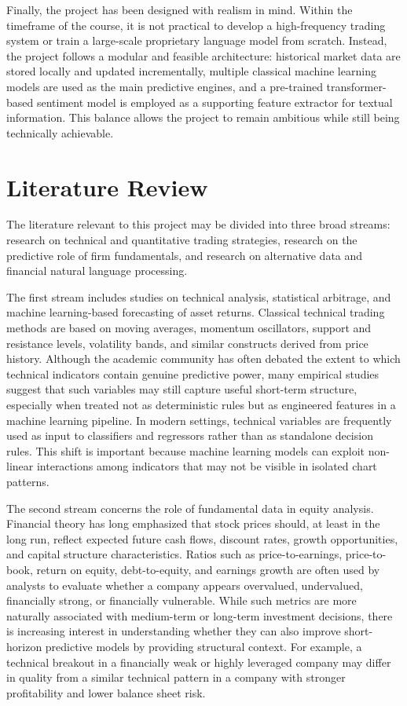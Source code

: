 \documentclass[12pt,a4paper]{article}
\begin{document}
Finally, the project has been designed with realism in mind. Within the timeframe of the course, it is not practical to develop a high-frequency trading system or train a large-scale proprietary language model from scratch. Instead, the project follows a modular and feasible architecture: historical market data are stored locally and updated incrementally, multiple classical machine learning models are used as the main predictive engines, and a pre-trained transformer-based sentiment model is employed as a supporting feature extractor for textual information. This balance allows the project to remain ambitious while still being technically achievable.

\section{Literature Review}

The literature relevant to this project may be divided into three broad streams: research on technical and quantitative trading strategies, research on the predictive role of firm fundamentals, and research on alternative data and financial natural language processing.

The first stream includes studies on technical analysis, statistical arbitrage, and machine learning-based forecasting of asset returns. Classical technical trading methods are based on moving averages, momentum oscillators, support and resistance levels, volatility bands, and similar constructs derived from price history. Although the academic community has often debated the extent to which technical indicators contain genuine predictive power, many empirical studies suggest that such variables may still capture useful short-term structure, especially when treated not as deterministic rules but as engineered features in a machine learning pipeline. In modern settings, technical variables are frequently used as input to classifiers and regressors rather than as standalone decision rules. This shift is important because machine learning models can exploit non-linear interactions among indicators that may not be visible in isolated chart patterns.

The second stream concerns the role of fundamental data in equity analysis. Financial theory has long emphasized that stock prices should, at least in the long run, reflect expected future cash flows, discount rates, growth opportunities, and capital structure characteristics. Ratios such as price-to-earnings, price-to-book, return on equity, debt-to-equity, and earnings growth are often used by analysts to evaluate whether a company appears overvalued, undervalued, financially strong, or financially vulnerable. While such metrics are more naturally associated with medium-term or long-term investment decisions, there is increasing interest in understanding whether they can also improve short-horizon predictive models by providing structural context. For example, a technical breakout in a financially weak or highly leveraged company may differ in quality from a similar technical pattern in a company with stronger profitability and lower balance sheet risk.
\end{document}
